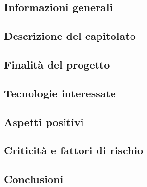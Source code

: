 
\subsection{Informazioni generali}


\subsection{Descrizione del capitolato}


\subsection{Finalità del progetto}


\subsection{Tecnologie interessate}


\subsection{Aspetti positivi}


\subsection{Criticità e fattori di rischio}


\subsection{Conclusioni}

